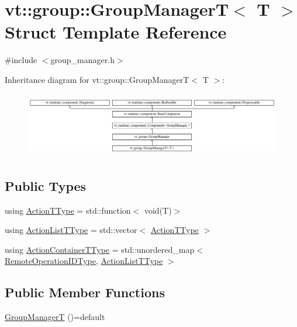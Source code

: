 \hypertarget{structvt_1_1group_1_1_group_manager_t}{}\section{vt\+:\+:group\+:\+:Group\+ManagerT$<$ T $>$ Struct Template Reference}
\label{structvt_1_1group_1_1_group_manager_t}


{\ttfamily \#include $<$group\+\_\+manager.\+h$>$}

Inheritance diagram for vt\+:\+:group\+:\+:Group\+ManagerT$<$ T $>$\+:\begin{figure}[H]
\begin{center}
\leavevmode
\includegraphics[height=2.889577cm]{structvt_1_1group_1_1_group_manager_t}
\end{center}
\end{figure}
\subsection*{Public Types}
\begin{DoxyCompactItemize}
\item 
using \hyperlink{structvt_1_1group_1_1_group_manager_t_acb20922687d3165d97de391fdbaf02ca}{Action\+T\+Type} = std\+::function$<$ void(T)$>$
\item 
using \hyperlink{structvt_1_1group_1_1_group_manager_t_a653158254f8de50d4070f0621644a48a}{Action\+List\+T\+Type} = std\+::vector$<$ \hyperlink{structvt_1_1group_1_1_group_manager_t_acb20922687d3165d97de391fdbaf02ca}{Action\+T\+Type} $>$
\item 
using \hyperlink{structvt_1_1group_1_1_group_manager_t_adc0d6d680c4f8bdbb80cd90f84a5f7ee}{Action\+Container\+T\+Type} = std\+::unordered\+\_\+map$<$ \hyperlink{namespacevt_1_1group_a73f2624ddeb535b39a08b6524f26b244}{Remote\+Operation\+I\+D\+Type}, \hyperlink{structvt_1_1group_1_1_group_manager_t_a653158254f8de50d4070f0621644a48a}{Action\+List\+T\+Type} $>$
\end{DoxyCompactItemize}
\subsection*{Public Member Functions}
\begin{DoxyCompactItemize}
\item 
\hyperlink{structvt_1_1group_1_1_group_manager_t_a751380e18149d43fefffd79d22d96ebc}{Group\+ManagerT} ()=default
\end{DoxyCompactItemize}
